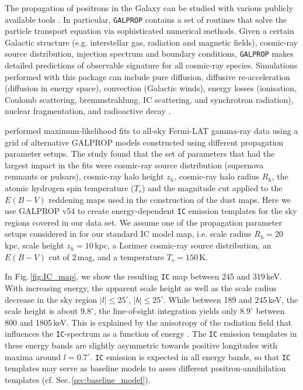 \documentclass[doublespace,draft,nopageskip]{VTthesis} %
\begin{document}
\begin{appendices}
	The propagation of positrons in the Galaxy can be studied with various publicly available tools \cite[e.g., \texttt{GALPROP} or \texttt{DRAGON},][]{Strong2007_GALPROP,Evoli2008_CRdiffuse}.
	In particular, \texttt{GALPROP} contains a set of routines that solve the particle transport equation via sophisticated numerical methods.
	Given a certain Galactic structure (e.g. interstellar gas, radiation and magnetic fields), cosmic-ray source distribution, injection spectrum and boundary conditions, \texttt{GALPROP} makes detailed predictions of observable signature for all cosmic-ray species.
	Simulations performed with this package can include pure diffusion, diffusive re-acceleration (diffusion in energy space), convection (Galactic winds),  energy losses (ionisation, Coulomb scattering, bremmstrahlung, IC scattering, and synchrotron radiation), nuclear fragmentation, and radioactive decay \citep{Moskalenko2005_CRprop}.
	
	\citet{Ackermann2012_FermiLATGeV} performed maximum-likelihood fits to all-sky Fermi-LAT gamma-ray data using a grid of alternative GALPROP models constructed using different propagation parameter setups.
	The study found that the set of parameters that had the largest impact in the fits were cosmic-ray source distribution (supernova remnants or pulsars), cosmic-ray halo height $z_h$, cosmic-ray halo radius $R_h$, the atomic hydrogen spin temperature ($T_s$) and the magnitude cut applied to the $E(B-V)$ reddening maps used in the construction of the dust maps.
	Here we use GALPROP v54 \citep{Strong2007_GALPROP} to create energy-dependent \texttt{IC} emission templates for the sky regions covered in our data set.
	We assume one of the propagation parameter setups considered in \citep{Ackermann2012_FermiLATGeV} for our standard IC model map, i.e. scale radius $R_h = 20$\,kpc, scale height $z_h = 10$\,kpc, a Lorimer cosmic-ray source distribution, an $E(B-V)$ cut of $2$\,mag, and a temperature $T_s = 150$\,K.
	
	In Fig.\,\ref{fig:IC_map}, we show the resulting \texttt{IC} map between 245 and 319\,keV.
	With increasing energy, the apparent scale height as well as the scale radius decrease in the sky region $|l|\leq25^{\circ}$, $|b|\leq25^{\circ}$.
	While between 189 and 245\,keV, the scale height is about $9.8^{\circ}$, the line-of-sight integration yields only $8.9^{\circ}$ between 800 and 1805\,keV.
	This is explained by the anisotropy of the radiation field that influences the \texttt{IC}-spectrum as a function of energy \citep{Moskalenko2000_IC}.
	The \texttt{IC} emission templates in these energy bands are slightly asymmetric towards positive longitudes with maxima around $l=0.7^{\circ}$.
	\texttt{IC} emission is expected in all energy bands, so that \texttt{IC} templates may serve as baseline models to asses different positron-annihilation templates (cf. Sec.\,\ref{sec:baseline_model}).
	

\end{appendices}
\end{document}
